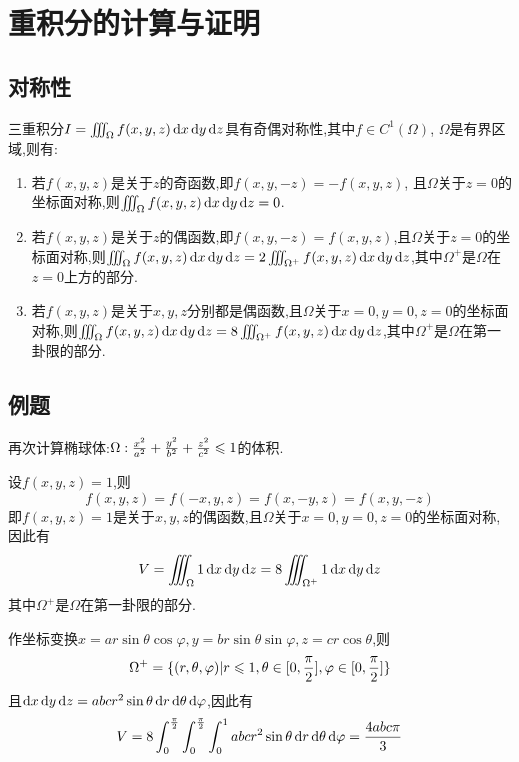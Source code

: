 \setcounter{chapter}{23} %


















\chapter{重积分的计算与证明}

\section{对称性}

三重积分$I = \iiint_\Omega f(x,y,z) \operatorname{d\!} x \operatorname{d\!} y \operatorname{d\!} z$具有奇偶对称性,其中$f \in C^1(\Omega)$, $\Omega$是有界区域,则有:

\begin{enumerate}
    \item 若$f(x,y,z)$是关于$z$的奇函数,即$f(x,y,-z) = -f(x,y,z)$,
    且$\Omega$关于$z=0$的坐标面对称,则$\iiint_\Omega f(x,y,z) \operatorname{d\!} x \operatorname{d\!} y \operatorname{d\!} z = 0$.
    \item 若$f(x,y,z)$是关于$z$的偶函数,即$f(x,y,-z) = f(x,y,z)$,且$\Omega$关于$z=0$的坐标面对称,则$\iiint_\Omega f(x,y,z) \operatorname{d\!} x \operatorname{d\!} y \operatorname{d\!} z = 2 \iiint_{\Omega^+} f(x,y,z) \operatorname{d\!} x \operatorname{d\!} y \operatorname{d\!} z$,其中$\Omega^+$是$\Omega$在$z=0$上方的部分.
    \item 若$f(x,y,z)$是关于$x,y,z$分别都是偶函数,且$\Omega$关于$x=0,y=0,z=0$的坐标面对称,则$\iiint_\Omega f(x,y,z) \operatorname{d\!} x \operatorname{d\!} y \operatorname{d\!} z = 8 \iiint_{\Omega^+} f(x,y,z) \operatorname{d\!} x \operatorname{d\!} y \operatorname{d\!} z$,其中$\Omega^+$是$\Omega$在第一卦限的部分.
\end{enumerate}

\section{例题}

\begin{example}
    再次计算椭球体:$\Omega: \frac{x^2}{a^2} + \frac{y^2}{b^2} + \frac{z^2}{c^2} \leqslant 1$的体积.
\end{example}

\begin{solution}
设$f(x,y,z) = 1$,则
$$f(x,y,z) = f(-x,y,z) = f(x,-y,z) = f(x,y,-z)$$
即$f(x,y,z)=1$是关于$x,y,z$的偶函数,且$\Omega$关于$x=0,y=0,z=0$的坐标面对称,因此有
$$V = \iiint_\Omega 1 \operatorname{d\!} x \operatorname{d\!} y \operatorname{d\!} z = 8 \iiint_{\Omega^+} 1 \operatorname{d\!} x \operatorname{d\!} y \operatorname{d\!} z$$
其中$\Omega^+$是$\Omega$在第一卦限的部分.

作坐标变换$x = a r \sin \theta \cos \varphi, y = b r \sin \theta \sin \varphi, z = c r \cos \theta$,则
$$\Omega^+ = \{ (r,\theta,\varphi) | r \leqslant 1, \theta \in [0,\frac{\pi}{2}], \varphi \in [0,\frac{\pi}{2}] \}$$
且$\operatorname{d\!} x \operatorname{d\!} y \operatorname{d\!} z = abc r^2 \sin \theta \operatorname{d\!} r \operatorname{d\!} \theta \operatorname{d\!} \varphi$,因此有
$$V = 8 \int_0^{\frac{\pi}{2}} \int_0^{\frac{\pi}{2}} \int_0^1 abc r^2 \sin \theta \operatorname{d\!} r \operatorname{d\!} \theta \operatorname{d\!} \varphi = \frac{4abc \pi}{3}$$
\end{solution}

